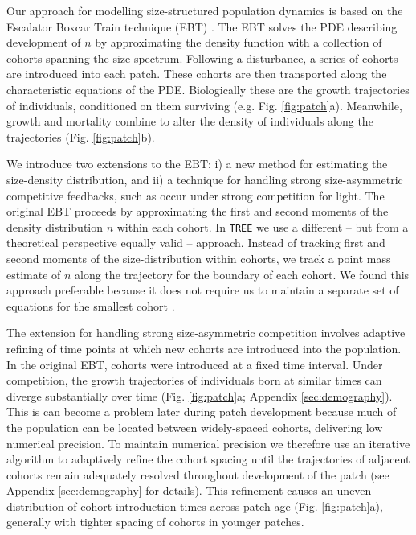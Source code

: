 \documentclass[a4paper,11pt]{article}
\begin{document}
Our approach for modelling size-structured population dynamics
is based on the Escalator Boxcar Train technique (EBT)
\citep{Deroos-1997, Deroos-1992, Deroos-1988}. The EBT solves the PDE
describing development of \(n\) by approximating the density function
with a collection of cohorts spanning the size spectrum. Following a
disturbance, a series of cohorts are introduced into each patch. These
cohorts are then transported along the characteristic equations of the
PDE. Biologically these are the growth trajectories of individuals,
conditioned on them surviving (e.g. Fig. \ref{fig:patch}a). Meanwhile,
growth and mortality combine to alter the density of individuals along
the trajectories (Fig. \ref{fig:patch}b).

We introduce two extensions to the EBT: i) a new method for estimating
the size-density distribution, and ii) a technique for handling strong
size-asymmetric competitive feedbacks, such as occur under strong
competition for light. The original EBT
\citep{Deroos-1997, Deroos-1992, Deroos-1988} proceeds by approximating
the first and second moments of the density distribution \(n\) within
each cohort. In \texttt{TREE} we use a different -- but from a theoretical
perspective equally valid --  approach. Instead of tracking first and second
moments of the size-distribution within cohorts, we track a point mass
estimate of \(n\) along the trajectory for the boundary
of each cohort. We found this approach preferable because it does not
require us to maintain a separate set of equations for the smallest
cohort \citep{Deroos-1997}.

The extension for handling strong size-asymmetric competition involves
adaptive refining of time points at which new cohorts are introduced
into the population. In the original EBT, cohorts were introduced at a
fixed time interval. Under competition, the growth trajectories of
individuals born at similar times can diverge substantially over time
(Fig. \ref{fig:patch}a; Appendix \ref{sec:demography}).
This is can become a problem later during patch
development because much of the population can be located between
widely-spaced cohorts, delivering low numerical precision. To maintain
numerical precision we therefore use an iterative algorithm to adaptively refine
the cohort spacing until the trajectories of adjacent cohorts remain
adequately resolved throughout development of the patch (see
Appendix \ref{sec:demography} for details). This refinement causes an uneven
distribution of cohort introduction times across patch age (Fig.
\ref{fig:patch}a), generally with tighter spacing of cohorts in 
younger patches.
\end{document}
